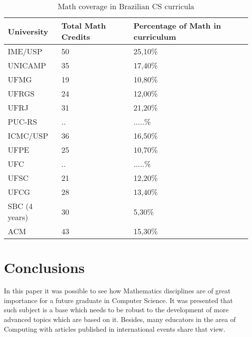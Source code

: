 \documentclass[conference]{IEEEtran}
\begin{document}
\begin{table}
	\centering
	\caption{Math coverage in Brazilian CS curricula}
    \begin{tabular}{|p{2cm}|p{2cm}|p{2cm}|}
        \hline
        University & Total Math Credits                    & Percentage of Math in curriculum          \\ \hline
        IME/USP      & 50                                  & 25,10\%                                   \\ 
        UNICAMP      & 35                                  & 17,40\%                                   \\ 
        UFMG         & 19                                  & 10,80\%                                   \\ 
        UFRGS        & 24                                  & 12,00\%                                   \\ 
        UFRJ         & 31                                  & 21,20\%                                   \\ 
        PUC-RS       & ..                                  & .....\%                                   \\ 
        ICMC/USP     & 36                                  & 16,50\%                                   \\ 
        UFPE         & 25                                  & 10,70\%                                   \\ 
        UFC          & ..                                  & .....\%                                   \\ 
        UFSC         & 21                                  & 12,20\%                                   \\ 
        UFCG         & 28                                  & 13,40\%                                   \\ 
        SBC (4 years)& 30                                  & 5,30\%                                    \\ 
        ACM          & 43                                  & 15,30\%                                   \\
        \hline
    \end{tabular}
\end{table}

\section{Conclusions}
	In this paper it was possible to see how Mathematics disciplines are of great importance for a future graduate in Computer Science. It was presented that such subject is a base which needs to be robust to the development of more advanced topics which are based on it. Besides, many educators in the area of Computing with articles published in international events share that view.
\end{document}
